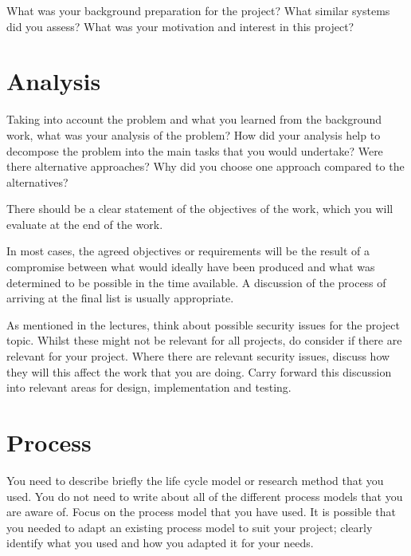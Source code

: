 What was your background preparation for the project? What similar systems did you assess? What was your motivation and interest in this project? 

\section{Analysis}
Taking into account the problem and what you learned from the background work, what was your analysis of the problem? How did your analysis help to decompose the problem into the main tasks that you would undertake? Were there alternative approaches? Why did you choose one approach compared to the alternatives? 

There should be a clear statement of the objectives of the work, which you will evaluate at the end of the work. 

In most cases, the agreed objectives or requirements will be the result of a compromise between what would ideally have been produced and what was determined to be possible in the time available. A discussion of the process of arriving at the final list is usually appropriate.

As mentioned in the lectures, think about possible security issues for the project topic. Whilst these might not be relevant for all projects, do consider if there are relevant for your project. Where there are relevant security issues, discuss how they will this affect the work that you are doing. Carry forward this discussion into relevant areas for design, implementation and testing.

\section{Process}
You need to describe briefly the life cycle model or research method that you used. You do not need to write about all of the different process models that you are aware of. Focus on the process model that you have used. It is possible that you needed to adapt an existing process model to suit your project; clearly identify what you used and how you adapted it for your needs.

